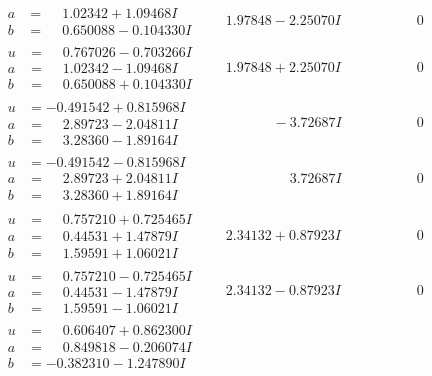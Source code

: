 \documentclass[1p]{elsarticle_modified}
\theoremstyle{definition}
\begin{document}
$$\begin{array}{c|c|c}
\begin{aligned}
a &= \phantom{-}1.02342 + 1.09468 I \\
b &= \phantom{-}0.650088 - 0.104330 I\end{aligned}
 & \phantom{-}1.97848 - 2.25070 I & \phantom{-0.000000 } 0 \\ \hline\begin{aligned}
u &= \phantom{-}0.767026 - 0.703266 I \\
a &= \phantom{-}1.02342 - 1.09468 I \\
b &= \phantom{-}0.650088 + 0.104330 I\end{aligned}
 & \phantom{-}1.97848 + 2.25070 I & \phantom{-0.000000 } 0 \\ \hline\begin{aligned}
u &= -0.491542 + 0.815968 I \\
a &= \phantom{-}2.89723 - 2.04811 I \\
b &= \phantom{-}3.28360 - 1.89164 I\end{aligned}
 & \phantom{-0.000000 } -3.72687 I & \phantom{-0.000000 } 0 \\ \hline\begin{aligned}
u &= -0.491542 - 0.815968 I \\
a &= \phantom{-}2.89723 + 2.04811 I \\
b &= \phantom{-}3.28360 + 1.89164 I\end{aligned}
 & \phantom{-0.000000 -}3.72687 I & \phantom{-0.000000 } 0 \\ \hline\begin{aligned}
u &= \phantom{-}0.757210 + 0.725465 I \\
a &= \phantom{-}0.44531 + 1.47879 I \\
b &= \phantom{-}1.59591 + 1.06021 I\end{aligned}
 & \phantom{-}2.34132 + 0.87923 I & \phantom{-0.000000 } 0 \\ \hline\begin{aligned}
u &= \phantom{-}0.757210 - 0.725465 I \\
a &= \phantom{-}0.44531 - 1.47879 I \\
b &= \phantom{-}1.59591 - 1.06021 I\end{aligned}
 & \phantom{-}2.34132 - 0.87923 I & \phantom{-0.000000 } 0 \\ \hline\begin{aligned}
u &= \phantom{-}0.606407 + 0.862300 I \\
a &= \phantom{-}0.849818 - 0.206074 I \\
b &= -0.382310 - 1.247890 I\end{aligned}

\end{array}$$
\end{document}
